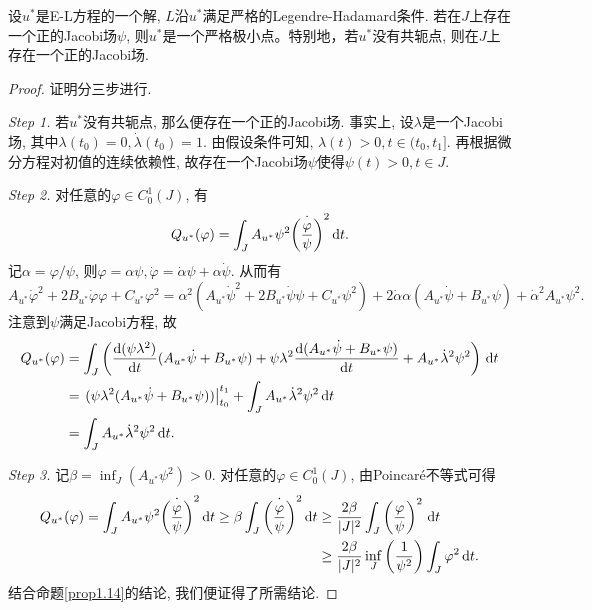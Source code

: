 \begin{proposition}[充分条件3, $N = 1$]
    设$u^*$是E-L方程的一个解, $L$沿$u^*$满足严格的Legendre-Hadamard条件.
    若在$J$上存在一个正的Jacobi场$\psi$, 则$u^*$是一个严格极小点。特别地，若$u^*$没有共轭点, 则在$J$上存在一个正的Jacobi场.
    \begin{proof}
        证明分三步进行.

        \emph{Step 1.} 若$u^*$没有共轭点, 那么便存在一个正的Jacobi场. 事实上, 设$\lambda$是一个Jacobi场, 其中$\lambda(t_0) = 0, \dot\lambda(t_0) = 1$.
        由假设条件可知, $\lambda(t) > 0, t \in (t_0, t_1]$. 再根据微分方程对初值的连续依赖性, 故存在一个Jacobi场$\psi$使得$\psi(t) > 0, t \in J$.

        \emph{Step 2.} 对任意的$\varphi \in C_0^1(J)$, 有 
        \begin{equation*}
            Q_{u^*}(\varphi)=\int_JA_{u^*}\psi^2\dot{\left(\frac{\varphi}{\psi}\right)}^2 \,{\rm d}t. 
        \end{equation*}
        记$\alpha = \varphi/\psi$, 则$\varphi = \alpha\psi, \dot\varphi = \dot\alpha\psi + \alpha\dot\psi$.
        从而有 
        \begin{equation*}
            A_{u^*}\dot\varphi^2+2B_{u^*}\dot\varphi\varphi+C_{u^*}\varphi^2=\alpha^2(A_{u^*}\dot\psi^2+2B_{u^*}\dot\psi\psi+C_{u^*}\psi^2)+2\dot\alpha\alpha(A_{u^*}\dot\psi+B_{u^*}\psi)+\dot\alpha^2A_{u^*}\psi^2. 
        \end{equation*}
        注意到$\psi$满足Jacobi方程, 故 
        \begin{align*}
            Q_{u^*}(\varphi) &= \int_J\left(\frac{{\rm d}(\psi\lambda^2)}{{\rm d}t}(A_{u^*}\dot\psi+B_{u^*}\psi) + \psi\lambda^2\frac{{\rm d}(A_{u^*}\dot\psi+B_{u^*}\psi) }{{\rm d}t} + A_{u^*}\dot\lambda^2\psi^2\right) \,{\rm d}t \\  
            &= \left.(\psi\lambda^2(A_{u^*}\dot\psi+B_{u^*}\psi))\right|_{t_0}^{t_1} + \int_JA_{u^*}\dot\lambda^2\psi^2\,{\rm d}t \\  
            &= \int_JA_{u^*}\dot\lambda^2\psi^2\,{\rm d}t.
        \end{align*}

        \emph{Step 3.} 记$\beta = \inf_J (A_{u^*}\psi^2) > 0$. 对任意的$\varphi \in C_0^1(J)$, 由Poincaré不等式可得 
        \begin{align*}
            Q_{u^*}(\varphi) = \int_JA_{u^*}\psi^2\dot{\left(\frac{\varphi}{\psi}\right)}^2\,{\rm d}t  \geq \beta\int_J\dot{\left(\frac{\varphi}{\psi}\right)}^2\,{\rm d}t &\geq \frac{2\beta}{|J|^2}\int_J\left(\frac{\varphi}{\psi}\right)^2 \,{\rm d}t 
            \\ &\geq \frac{2\beta}{|J|^2}\inf_J\left(\frac{1}{\psi^2}\right)\int_J\varphi^2 \,{\rm d}t.
        \end{align*}
        结合命题\ref{prop1.14}的结论, 我们便证得了所需结论.
    \end{proof}
\end{proposition}

